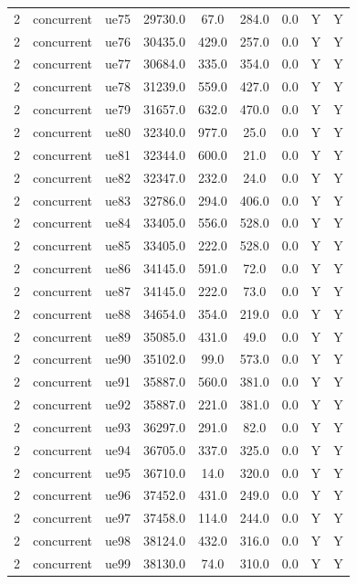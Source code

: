 \begin{table}[ht]
\begin{tabular}{|c|c|c|c|c|c|c|c|c|}
2 & concurrent & ue75 & 29730.0 & 67.0 & 284.0 & 0.0 & Y & Y \\
2 & concurrent & ue76 & 30435.0 & 429.0 & 257.0 & 0.0 & Y & Y \\
2 & concurrent & ue77 & 30684.0 & 335.0 & 354.0 & 0.0 & Y & Y \\
2 & concurrent & ue78 & 31239.0 & 559.0 & 427.0 & 0.0 & Y & Y \\
2 & concurrent & ue79 & 31657.0 & 632.0 & 470.0 & 0.0 & Y & Y \\
2 & concurrent & ue80 & 32340.0 & 977.0 & 25.0 & 0.0 & Y & Y \\
2 & concurrent & ue81 & 32344.0 & 600.0 & 21.0 & 0.0 & Y & Y \\
2 & concurrent & ue82 & 32347.0 & 232.0 & 24.0 & 0.0 & Y & Y \\
2 & concurrent & ue83 & 32786.0 & 294.0 & 406.0 & 0.0 & Y & Y \\
2 & concurrent & ue84 & 33405.0 & 556.0 & 528.0 & 0.0 & Y & Y \\
2 & concurrent & ue85 & 33405.0 & 222.0 & 528.0 & 0.0 & Y & Y \\
2 & concurrent & ue86 & 34145.0 & 591.0 & 72.0 & 0.0 & Y & Y \\
2 & concurrent & ue87 & 34145.0 & 222.0 & 73.0 & 0.0 & Y & Y \\
2 & concurrent & ue88 & 34654.0 & 354.0 & 219.0 & 0.0 & Y & Y \\
2 & concurrent & ue89 & 35085.0 & 431.0 & 49.0 & 0.0 & Y & Y \\
2 & concurrent & ue90 & 35102.0 & 99.0 & 573.0 & 0.0 & Y & Y \\
2 & concurrent & ue91 & 35887.0 & 560.0 & 381.0 & 0.0 & Y & Y \\
2 & concurrent & ue92 & 35887.0 & 221.0 & 381.0 & 0.0 & Y & Y \\
2 & concurrent & ue93 & 36297.0 & 291.0 & 82.0 & 0.0 & Y & Y \\
2 & concurrent & ue94 & 36705.0 & 337.0 & 325.0 & 0.0 & Y & Y \\
2 & concurrent & ue95 & 36710.0 & 14.0 & 320.0 & 0.0 & Y & Y \\
2 & concurrent & ue96 & 37452.0 & 431.0 & 249.0 & 0.0 & Y & Y \\
2 & concurrent & ue97 & 37458.0 & 114.0 & 244.0 & 0.0 & Y & Y \\
2 & concurrent & ue98 & 38124.0 & 432.0 & 316.0 & 0.0 & Y & Y \\
2 & concurrent & ue99 & 38130.0 & 74.0 & 310.0 & 0.0 & Y & Y \\

\end{tabular}
\end{table}
